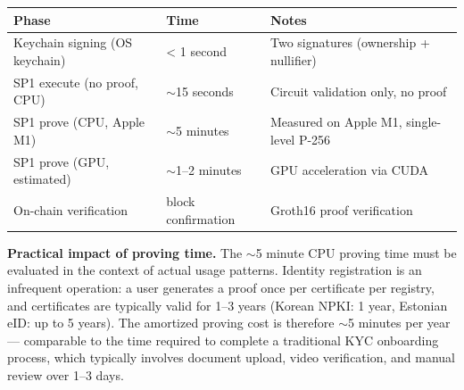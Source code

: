 \documentclass[11pt, a4paper]{article}
\begin{document}
\begin{longtable}[]{@{}
  >{\raggedright\arraybackslash}p{}
  >{\raggedright\arraybackslash}p{}
  >{\raggedright\arraybackslash}p{}@{}}
\toprule\noalign{}
\begin{minipage}[b]{\linewidth}\raggedright
Phase
\end{minipage} & \begin{minipage}[b]{\linewidth}\raggedright
Time
\end{minipage} & \begin{minipage}[b]{\linewidth}\raggedright
Notes
\end{minipage} \\
\midrule\noalign{}
\endhead
\bottomrule\noalign{}
\endlastfoot
Keychain signing (OS keychain) & \textless{} 1 second & Two signatures
(ownership + nullifier) \\
SP1 execute (no proof, CPU) & $\sim$15 seconds & Circuit
validation only, no proof \\
SP1 prove (CPU, Apple M1) & $\sim$5 minutes & Measured on Apple
M1, single-level P-256 \\
SP1 prove (GPU, estimated) & $\sim$1--2 minutes & GPU
acceleration via CUDA \\
On-chain verification & 1 block confirmation & Groth16 proof
verification \\
\end{longtable}

\textbf{Practical impact of proving time.} The $\sim$5 minute
CPU proving time must be evaluated in the context of actual usage
patterns. Identity registration is an infrequent operation: a user
generates a proof once per certificate per registry, and certificates
are typically valid for 1--3 years (Korean NPKI: 1 year, Estonian eID:
up to 5 years). The amortized proving cost is therefore $\sim$5
minutes per year --- comparable to the time required to complete a
traditional KYC onboarding process, which typically involves document
upload, video verification, and manual review over 1--3 days.
\end{document}
